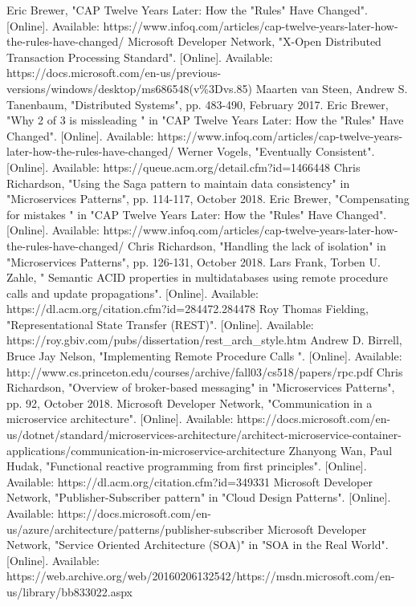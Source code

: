 \documentclass[conference]{IEEEtran}
\begin{document}
\begin{thebibliography}{1}
Eric Brewer, "CAP Twelve Years Later: How the "Rules" Have Changed". [Online]. Available: https://www.infoq.com/articles/cap-twelve-years-later-how-the-rules-have-changed/
Microsoft Developer Network, "X-Open Distributed Transaction Processing Standard". [Online]. Available: https://docs.microsoft.com/en-us/previous-versions/windows/desktop/ms686548(v\%3Dvs.85)
Maarten van Steen, Andrew S. Tanenbaum, "Distributed Systems", pp. 483-490, February 2017.
Eric Brewer, "Why 2 of 3 is missleading
" in "CAP Twelve Years Later: How the "Rules" Have Changed". [Online]. Available: https://www.infoq.com/articles/cap-twelve-years-later-how-the-rules-have-changed/
Werner Vogels, "Eventually Consistent". [Online]. Available: https://queue.acm.org/detail.cfm?id=1466448
Chris Richardson, "Using the Saga pattern to maintain data consistency" in "Microservices Patterns", pp. 114-117, October 2018.
Eric Brewer, "Compensating for mistakes
" in "CAP Twelve Years Later: How the "Rules" Have Changed". [Online]. Available: https://www.infoq.com/articles/cap-twelve-years-later-how-the-rules-have-changed/
Chris Richardson, "Handling the lack of isolation" in "Microservices Patterns", pp. 126-131, October 2018.
Lars Frank, Torben U. Zahle, "
Semantic ACID properties in multidatabases using remote procedure calls and update propagations". [Online]. Available: https://dl.acm.org/citation.cfm?id=284472.284478
Roy Thomas Fielding, "Representational State Transfer (REST)". [Online]. Available: https://roy.gbiv.com/pubs/dissertation/rest\_arch\_style.htm
Andrew D. Birrell, Bruce Jay Nelson, "Implementing Remote Procedure Calls ". [Online]. Available: http://www.cs.princeton.edu/courses/archive/fall03/cs518/papers/rpc.pdf
Chris Richardson, "Overview of broker-based messaging" in "Microservices Patterns", pp. 92, October 2018.
Microsoft Developer Network, "Communication in a microservice architecture". [Online]. Available: https://docs.microsoft.com/en-us/dotnet/standard/microservices-architecture/architect-microservice-container-applications/communication-in-microservice-architecture
Zhanyong Wan, Paul Hudak, "Functional reactive programming from first principles". [Online]. Available: https://dl.acm.org/citation.cfm?id=349331
Microsoft Developer Network, "Publisher-Subscriber pattern" in "Cloud Design Patterns". [Online]. Available: https://docs.microsoft.com/en-us/azure/architecture/patterns/publisher-subscriber
Microsoft Developer Network, "Service Oriented Architecture (SOA)" in "SOA in the Real World". [Online]. Available: https://web.archive.org/web/20160206132542/https://msdn.microsoft.com/en-us/library/bb833022.aspx

\end{thebibliography}




\end{document}
